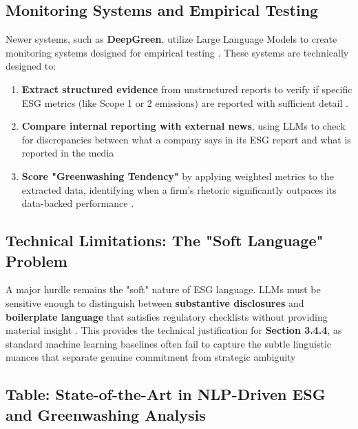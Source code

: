 \documentclass[english, online, cse, master]{dithesis}
\begin{document}
\subsection{ Monitoring Systems and Empirical Testing}

Newer systems, such as \textbf{DeepGreen}, utilize Large Language Models to create monitoring systems designed for empirical testing  \parencite{chong_xu_bff21576}. These systems are technically designed to:
\begin{enumerate}
\item 

\textbf{Extract structured evidence} from unstructured reports to verify if specific ESG metrics (like Scope 1 or 2 emissions) are reported with sufficient detail  \parencite{chong_xu_bff21576}.\item 

\textbf{Compare internal reporting with external news}, using LLMs to check for discrepancies between what a company says in its ESG report and what is reported in the media  \parencite[]{mariya_pavlova_259be499, fabian_billert_a5fbb687}\item 

\textbf{Score "Greenwashing Tendency"} by applying weighted metrics to the extracted data, identifying when a firm’s rhetoric significantly outpaces its data-backed performance  \parencite{chong_xu_bff21576}.
\end{enumerate}
\subsection{Technical Limitations: The "Soft Language" Problem}

A major hurdle remains the "soft" nature of ESG language. LLMs must be sensitive enough to distinguish between \textbf{substantive disclosures} and \textbf{boilerplate language} that satisfies regulatory checklists without providing material insight  \parencite{frederik_maibaum_b8629037}. This provides the technical justification for \textbf{Section 3.4.4}, as standard machine learning baselines often fail to capture the subtle linguistic nuances that separate genuine commitment from strategic ambiguity  \parencite[]{marco_bronzini_bf94d949, arash_hajikhani_cbb2528f}
\subsection{Table: State-of-the-Art in NLP-Driven ESG and Greenwashing Analysis}
\end{document}
